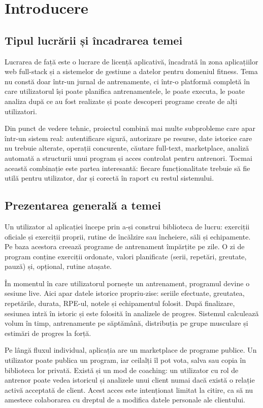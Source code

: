 \chapter{Introducere}
\label{cap:introducere}

\section{Tipul lucrării și încadrarea temei}

Lucrarea de față este o lucrare de licență aplicativă, încadrată în zona aplicațiilor web full-stack
și a sistemelor de gestiune a datelor pentru domeniul fitness. Tema nu constă doar într-un jurnal de
antrenamente, ci într-o platformă completă în care utilizatorul își poate planifica antrenamentele,
le poate executa, le poate analiza după ce au fost realizate și poate descoperi programe create de
alți utilizatori.

Din punct de vedere tehnic, proiectul combină mai multe subprobleme care apar într-un sistem real:
autentificare sigură, autorizare pe resurse, date istorice care nu trebuie alterate, operații
concurente, căutare full-text, marketplace, analiză automată a structurii unui program și acces
controlat pentru antrenori. Tocmai această combinație este partea interesantă: fiecare funcționalitate
trebuie să fie utilă pentru utilizator, dar și corectă în raport cu restul sistemului.

\section{Prezentarea generală a temei}

Un utilizator al aplicației începe prin a-și construi biblioteca de lucru: exerciții oficiale și
exerciții proprii, rutine de încălzire sau încheiere, săli și echipamente. Pe baza acestora creează
programe de antrenament împărțite pe zile. O zi de program conține exerciții ordonate, valori
planificate (serii, repetări, greutate, pauză) și, opțional, rutine atașate.

În momentul în care utilizatorul pornește un antrenament, programul devine o sesiune live. Aici apar
datele istorice propriu-zise: seriile efectuate, greutatea, repetările, durata, RPE-ul, notele și
echipamentul folosit. După finalizare, sesiunea intră în istoric și este folosită în analizele de
progres. Sistemul calculează volum în timp, antrenamente pe săptămână, distribuția pe grupe musculare
și estimări de progres la forță.

Pe lângă fluxul individual, aplicația are un marketplace de programe publice. Un utilizator poate
publica un program, iar ceilalți îl pot vota, salva sau copia în biblioteca lor privată. Există și un
mod de coaching: un utilizator cu rol de antrenor poate vedea istoricul și analizele unui client numai
dacă există o relație activă acceptată de client. Acest acces este intenționat limitat la citire, ca
să nu amestece colaborarea cu dreptul de a modifica datele personale ale clientului.

